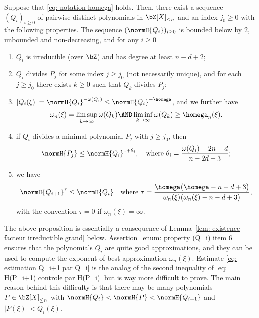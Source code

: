 \begin{Prop}
\label{prop: existence Qi}
Suppose that \eqref{eq: notation homega} holds. Then, there exist a sequence $(Q_i)_{i\geq 0}$ of pairwise distinct polynomials in $\bZ[X]_{\leq n}$ and an index $j_0\geq 0$ with the following properties. The sequence $(\normH{Q_i})_{i\geq 0}$ is bounded below by $2$, unbounded and non-decreasing, and for any $i\geq 0$
\begin{enumerate}
\item \label{enum: property (Q_i) item 1} $Q_i$ is irreducible (over $\bZ$) and has degree at least $n-d+2$;
\item $Q_i$ divides $P_j$ for some index $j\geq j_0$ (not necessarily unique), and for each $j\geq j_0$ there exists $k\geq 0$ such that $Q_k$ divides $P_j$;
\item \label{enum: property (Q_i) item 6} $|Q_i(\xi)| = \normH{Q_i}^{-\omega(Q_i)}\leq \normH{Q_i}^{-\homega}$, and we further have
\begin{equation}
\label{eq: omega_n donné par les Q_i}
\omega_n(\xi) = \limsup_{k\to \infty} \omega(Q_k) \AND \liminf_{k\to \infty} \omega(Q_k) \geq \homega_n(\xi).
\end{equation}
\item \label{enum: H(P_j) controle par H(Q_i)} if $Q_i$ divides a minimal polynomial $P_j$ with $j\geq j_0$, then
\begin{equation}
\label{eq: premiere estimation Pj vs Qi}
\normH{P_j} \leq \normH{Q_i}^{1+\theta_i}, \quad \textrm{where } \theta_i = \frac{\omega(Q_i)-2n+d}{n-2d+3};
\end{equation}
\item \label{enum: H(Q_i+1) controle par H(Q_i)} we have
\begin{equation}
\label{eq: estimation Q_i+1 par Q_i}
\normH{Q_{i+1}}^\tau \leq \normH{Q_i} \quad \textrm{where } \tau = \frac{\homega\big(\homega -n-d+3\big)}{\omega_n(\xi)\big(\omega_n(\xi)-n-d+3\big)},
\end{equation}
with the convention $\tau= 0$ if $\omega_n(\xi) = \infty$.
\end{enumerate}
\end{Prop}

The above proposition is essentially a consequence of Lemma~\ref{lem: existence facteur irreductible grand} below. Assertion~\eqref{enum: property (Q_i) item 6} ensures that the polynomials $Q_i$ are quite good approximations, and they can be used to compute the exponent of best approximation $\omega_n(\xi)$. Estimate \eqref{eq: estimation Q_i+1 par Q_i} is the analog of the second inequality of \eqref{eq: H(P_i+1) controle par H(P_i)} but is way more difficult to prove. The main reason behind this difficulty is that there may be many polynomials $P\in\bZ[X]_{\leq n}$ with $\normH{Q_i} < \normH{P} < \normH{Q_{i+1}}$ and $|P(\xi)| < Q_i(\xi)$.

